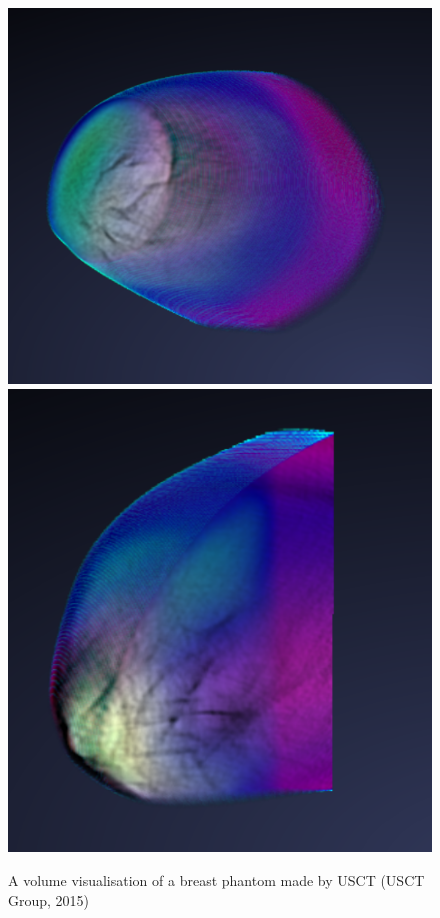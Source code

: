 \documentclass[twoside, english, 11pt]{report}
\begin{document}
\begin{figure}[!h]
\includegraphics[scale=0.4]{img/usct1}\includegraphics[scale=0.4335]{img/usct2}\\
\caption{A volume visualisation of a breast phantom made by USCT (USCT Group, 2015)\label{fig:usct}}
\end{figure}
\end{document}
